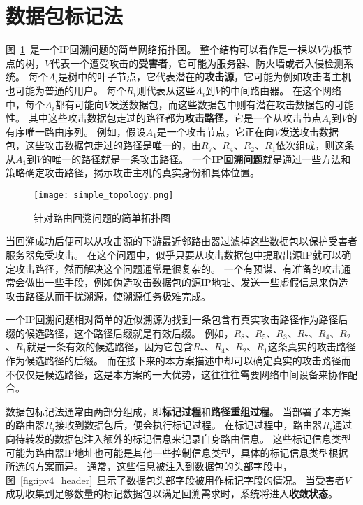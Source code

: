 \section{数据包标记法}
图~\ref{fig:simple_topology}~是一个IP回溯问题的简单网络拓扑图。
整个结构可以看作是一棵以$V$为根节点的树，$V$代表一个遭受攻击的\textbf{受害者}，它可能为服务器、防火墙或者入侵检测系统。
每个$A_i$是树中的叶子节点，它代表潜在的\textbf{攻击源}，它可能为例如攻击者主机也可能为普通的用户。
每个$R_i$则代表从这些$A_i$到$V$的中间路由器。
在这个网络中，每个$A_i$都有可能向$V$发送数据包，而这些数据包中则有潜在攻击数据包的可能性。
其中这些攻击数据包走过的路径都为\textbf{攻击路径}，它是一个从攻击节点$A_i$到$V$的有序唯一路由序列。
例如，假设$A_1$是一个攻击节点，它正在向$V$发送攻击数据包，这些攻击数据包走过的路径是唯一的，由$R_7$、$R_4$、$R_2$、$R_1$依次组成，则这条从$A_1$到$V$的唯一的路径就是一条攻击路径。
一个\textbf{IP回溯问题}就是通过一些方法和策略确定攻击路径，揭示攻击主机的真实身份和具体位置。

\begin{figure}[htbp]
    \centering
    \texttt{[image: simple\_topology.png]}
    \caption{针对路由回溯问题的简单拓扑图}
    \label{fig:simple_topology}
  \end{figure}

当回溯成功后便可以从攻击源的下游最近邻路由器过滤掉这些数据包以保护受害者服务器免受攻击。
在这个问题中，似乎只要从攻击数据包中提取出源IP就可以确定攻击路径，然而解决这个问题通常是很复杂的。
一个有预谋、有准备的攻击通常会做出一些手段，例如伪造攻击数据包的源IP地址、发送一些虚假信息来伪造攻击路径从而干扰溯源，使溯源任务极难完成。



一个IP回溯问题相对简单的近似溯源为找到一条包含有真实攻击路径作为路径后缀的候选路径，这个路径后缀就是有效后缀\cite{savage2000practical}。
例如，$R_8$、$R_5$、$R_3$、$R_7$、$R_4$、$R_2$、$R_1$就是一条有效的候选路径，因为它包含$R_7$、$R_4$、$R_2$、$R_1$这条真实的攻击路径作为候选路径的后缀。
而在接下来的本方案描述中却可以确定真实的攻击路径而不仅仅是候选路径，这是本方案的一大优势，这往往往需要网络中间设备来协作配合。



数据包标记法通常由两部分组成，即\textbf{标记过程}和\textbf{路径重组过程}。
当部署了本方案的路由器$R_i$接收到数据包后，便会执行标记过程。
在标记过程中，路由器$R_i$通过向待转发的数据包注入额外的标记信息来记录自身路由信息。
这些标记信息类型可能为路由器IP地址也可能是其他一些控制信息类型，具体的标记信息类型根据所选的方案而异。
通常，这些信息被注入到数据包的头部字段中，图~\ref{fig:ipv4_header}~显示了数据包头部字段被用作标记字段的情况。
当受害者$V$成功收集到足够数量的标记数据包以满足回溯需求时，系统将进入\textbf{收敛状态}。



